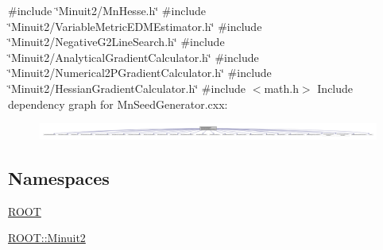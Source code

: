 {\ttfamily \#include \char`\"{}Minuit2/\+Mn\+Hesse.\+h\char`\"{}}\newline
{\ttfamily \#include \char`\"{}Minuit2/\+Variable\+Metric\+E\+D\+M\+Estimator.\+h\char`\"{}}\newline
{\ttfamily \#include \char`\"{}Minuit2/\+Negative\+G2\+Line\+Search.\+h\char`\"{}}\newline
{\ttfamily \#include \char`\"{}Minuit2/\+Analytical\+Gradient\+Calculator.\+h\char`\"{}}\newline
{\ttfamily \#include \char`\"{}Minuit2/\+Numerical2\+P\+Gradient\+Calculator.\+h\char`\"{}}\newline
{\ttfamily \#include \char`\"{}Minuit2/\+Hessian\+Gradient\+Calculator.\+h\char`\"{}}\newline
{\ttfamily \#include $<$math.\+h$>$}\newline
Include dependency graph for Mn\+Seed\+Generator.\+cxx\+:
\nopagebreak
\begin{figure}[H]
\begin{center}
\leavevmode
\includegraphics[width=350pt]{db/d87/adat-devel_2other__libs_2minuit_2src_2MnSeedGenerator_8cxx__incl}
\end{center}
\end{figure}
\subsection*{Namespaces}
\begin{DoxyCompactItemize}
\item 
 \mbox{\hyperlink{namespaceROOT}{R\+O\+OT}}
\item 
 \mbox{\hyperlink{namespaceROOT_1_1Minuit2}{R\+O\+O\+T\+::\+Minuit2}}
\end{DoxyCompactItemize}
